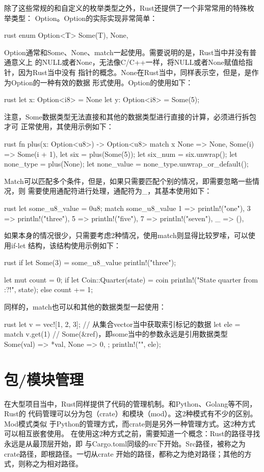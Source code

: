 除了这些常规的和自定义的枚举类型之外，Rust还提供了一个非常常用的特殊枚举类型：
Option。Option的实际实现非常简单：
\begin{code-block}{rust}
enum Option<T> {
    Some(T),
    None,
}
\end{code-block}
Option通常和Some、None、match一起使用。需要说明的是，Rust当中并没有普通意义上
的NULL或者None，无法像C/C++一样，将NULL或者None赋值给指针，因为Rust当中没有
指针的概念。None在Rust当中，同样表示空，但是，是作为Option的一种有效的数据
形式使用。Option的使用如下：
\begin{code-block}{rust}
let x: Option<i8> = None
let y: Option<i8> = Some(5);
\end{code-block}
注意，Some数据类型无法直接和其他的数据类型进行直接的计算，必须进行拆包才可
正常使用，其使用示例如下：
\begin{code-block}{rust}
fn plus(x: Option<u8>) -> Option<u8> {
    match x {
       None => None,
       Some(i) => Some(i + 1),
    }
}
let six = plus(Some(5));
let six_num = six.unwrap();
let none_type = plus(None);
let none_value = none_type.unwrap_or_default();
\end{code-block}

Match可以匹配多个条件，但是，如果只需要匹配个别的情况，即需要忽略一些情况，则
需要使用通配符进行处理，通配符为\_，其基本使用如下：
\begin{code-block}{rust}
let some_u8_value = 0u8;
match some_u8_value {
    1 => println!("one"),
    3 => println!("three"),
    5 => println!("five"),
    7 => println!("seven"),
    _ => (),
}
\end{code-block}
如果本身的情况很少，只需要考虑2种情况，使用match则显得比较罗嗦，可以使用if-let
结构，该结构使用示例如下：
\begin{code-block}{rust}
if let Some(3) = some_u8_value {
    println!("three");
}

let mut count = 0;
if let Coin::Quarter(state) = coin {
    println!("State quarter from {:?}!", state);
} else {
    count += 1;
}
\end{code-block}

同样的，match也可以和其他的数据类型一起使用：
\begin{code-block}{rust}
let v = vec![1, 2, 3];
// 从集合vector当中获取索引标记的数据
let ele = match v.get(1) {
    // Some(&ref)，即some当中的参数永远是引用数据类型
    Some(val) => *val,
    None => 0,
};
println!("{}", ele);
\end{code-block}

\section{包/模块管理}
在大型项目当中，Rust同样提供了代码的管理机制。和Python、Golang等不同，Rust的
代码管理可以分为包（crate）和模块（mod）。这2种模式有不少的区别。Mod模式类似
于Python的管理方式，而crate则是另外一种管理方式。这2种方式可以相互嵌套使用。
在使用这2种方式之前，需要知道一个概念：Rust的路径寻找永远是从最顶层开始，即
与Cargo.toml同级的src下开始。Src路径，被称之为crate路径，即根路径。一切从crate
开始的路径，都称之为绝对路径；其他的方式，则称之为相对路径。

